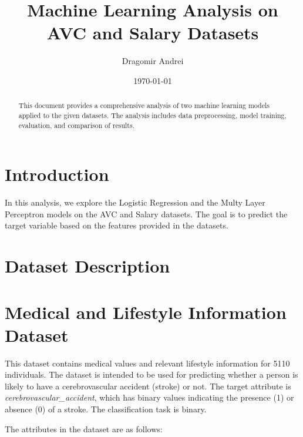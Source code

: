 \documentclass[a4paper,12pt]{article}
\title{Machine Learning Analysis on AVC and Salary Datasets}
\author{Dragomir Andrei}
\date{\today}
\begin{document}
\maketitle

\begin{abstract}
This document provides a comprehensive analysis of two machine learning models applied to the given datasets. The analysis includes data preprocessing, model training, evaluation, and comparison of results.
\end{abstract}

\newpage

\tableofcontents
\newpage

\section{Introduction}
In this analysis, we explore the Logistic Regression and the Multy Layer Perceptron models on the AVC and Salary datasets. The goal is to predict the target variable based on the features provided in the datasets.

\section*{Dataset Description}
\section{Medical and Lifestyle Information Dataset}

This dataset contains medical values and relevant lifestyle information for 5110 individuals. The dataset is intended to be used for predicting whether a person is likely to have a cerebrovascular accident (stroke) or not. The target attribute is \textit{cerebrovascular\_accident}, which has binary values indicating the presence (1) or absence (0) of a stroke. The classification task is binary.

The attributes in the dataset are as follows:
\end{document}
